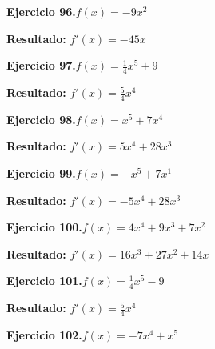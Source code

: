\documentclass[10pt,a4paper]{article}
\begin{document}
\begin{ejbox}
\textbf{Ejercicio 96.}\quad $f(x) = -9x^{2}$
\end{ejbox}

\begin{solbox}
\textbf{Resultado:} \(\displaystyle f'(x) = -45x\)
\end{solbox}

\newpage
\begin{ejbox}
\textbf{Ejercicio 97.}\quad $f(x) = \frac{1}{4}x^{5} +9$
\end{ejbox}

\begin{solbox}
\textbf{Resultado:} \(\displaystyle f'(x) = \frac{5}{4}x^{4}\)
\end{solbox}

\begin{ejbox}
\textbf{Ejercicio 98.}\quad $f(x) = x^{5} + 7x^{4}$
\end{ejbox}

\begin{solbox}
\textbf{Resultado:} \(\displaystyle f'(x) = 5x^{4} + 28x^{3}\)
\end{solbox}

\begin{ejbox}
\textbf{Ejercicio 99.}\quad $f(x) = -x^{5} + 7x^{1}$
\end{ejbox}

\begin{solbox}
\textbf{Resultado:} \(\displaystyle f'(x) = -5x^{4} + 28x^{3}\)
\end{solbox}

\newpage
\begin{ejbox}
\textbf{Ejercicio 100.}\quad $f(x) = 4x^4 +9x^3 +7x^2$
\end{ejbox}

\begin{solbox}
\textbf{Resultado:} \(\displaystyle f'(x) = 16x^3 +27x^2 +14x\)
\end{solbox}

\begin{ejbox}
\textbf{Ejercicio 101.}\quad $f(x) = \frac{1}{4}x^{5} -9$
\end{ejbox}

\begin{solbox}
\textbf{Resultado:} \(\displaystyle f'(x) = \frac{5}{4}x^{4}\)
\end{solbox}

\begin{ejbox}
\textbf{Ejercicio 102.}\quad $f(x) = -7x^{4} + x^{5}$
\end{ejbox}
\end{document}
